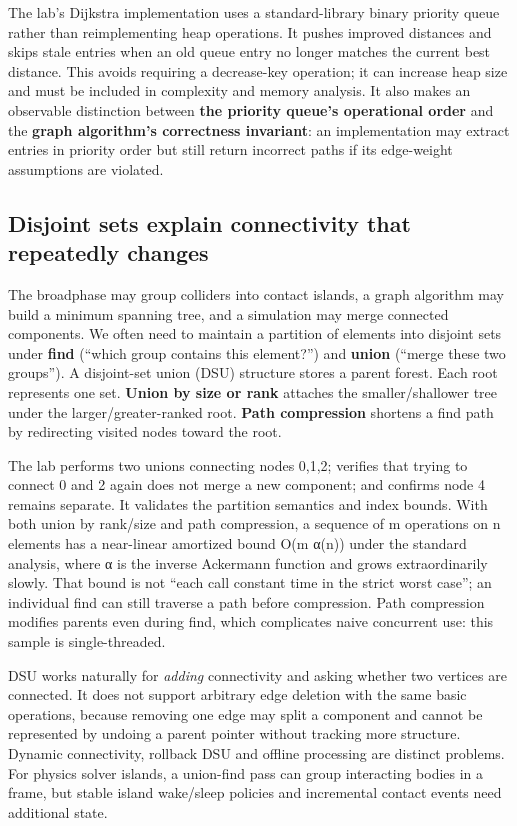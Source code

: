 The lab's Dijkstra implementation uses a standard-library binary priority queue rather than reimplementing heap operations. It pushes improved distances and skips stale entries when an old queue entry no longer matches the current best distance. This avoids requiring a decrease-key operation; it can increase heap size and must be included in complexity and memory analysis. It also makes an observable distinction between \textbf{the priority queue's operational order} and the \textbf{graph algorithm's correctness invariant}: an implementation may extract entries in priority order but still return incorrect paths if its edge-weight assumptions are violated.

\subsection{Disjoint sets explain connectivity that repeatedly changes}\label{05-engine-i-ch007-disjoint-sets-explain-connectivity-that-repeatedly-changes}

The broadphase may group colliders into contact islands, a graph algorithm may build a minimum spanning tree, and a simulation may merge connected components. We often need to maintain a partition of elements into disjoint sets under \textbf{find} (``which group contains this element?'') and \textbf{union} (``merge these two groups''). A disjoint-set union (DSU) structure stores a parent forest. Each root represents one set. \textbf{Union by size or rank} attaches the smaller/shallower tree under the larger/greater-ranked root. \textbf{Path compression} shortens a find path by redirecting visited nodes toward the root.

The lab performs two unions connecting nodes 0,1,2; verifies that trying to connect 0 and 2 again does not merge a new component; and confirms node 4 remains separate. It validates the partition semantics and index bounds. With both union by rank/size and path compression, a sequence of m operations on n elements has a near-linear amortized bound O(m α(n)) under the standard analysis, where α is the inverse Ackermann function and grows extraordinarily slowly. That bound is not ``each call constant time in the strict worst case''; an individual find can still traverse a path before compression. Path compression modifies parents even during find, which complicates naive concurrent use: this sample is single-threaded.

DSU works naturally for \emph{adding} connectivity and asking whether two vertices are connected. It does not support arbitrary edge deletion with the same basic operations, because removing one edge may split a component and cannot be represented by undoing a parent pointer without tracking more structure. Dynamic connectivity, rollback DSU and offline processing are distinct problems. For physics solver islands, a union-find pass can group interacting bodies in a frame, but stable island wake/sleep policies and incremental contact events need additional state.

